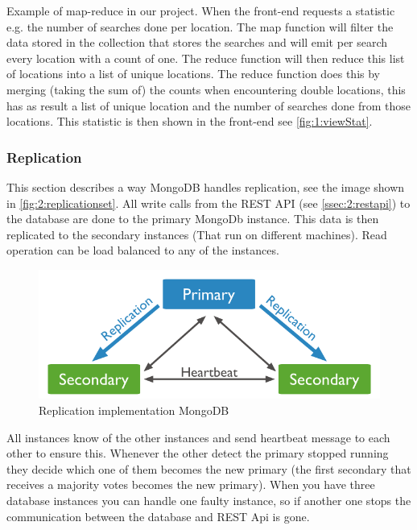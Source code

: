Example of map-reduce in our project. When the front-end requests a statistic e.g. the number of searches done per location. The map function will filter the data stored in the collection that stores the searches and will emit per search every location with a count of one. The reduce function will then reduce this list of locations into a list of unique locations. The reduce function does this by merging (taking the sum of) the counts when encountering double locations, this has as result a list of unique location and the number of searches done from those locations. This statistic is then shown in the front-end see \autoref{fig:1:viewStat}.

\subsubsection{Replication}
\label{sssec:2:replication}
This section describes a way MongoDB handles replication, see the image shown in \autoref{fig:2:replicationset}. All write calls from the REST API (see \autoref{ssec:2:restapi}) to the database are done to the primary MongoDb instance. This data is then replicated to the secondary instances (That run on different machines). Read operation can be load balanced to any of the instances. 

\begin{figure}
\includegraphics[width=\textwidth]{./img/replica_set}   
\caption{Replication implementation MongoDB}
\label{fig:2:replicationset}
\end{figure}

All instances know of the other instances and send heartbeat message to each other to ensure this. Whenever the other detect the primary stopped running they decide which one of them becomes the new primary (the first secondary that receives a majority votes becomes the new primary). When you have three database instances you can handle one faulty instance, so if another one stops the communication between the database and REST Api is gone. 

